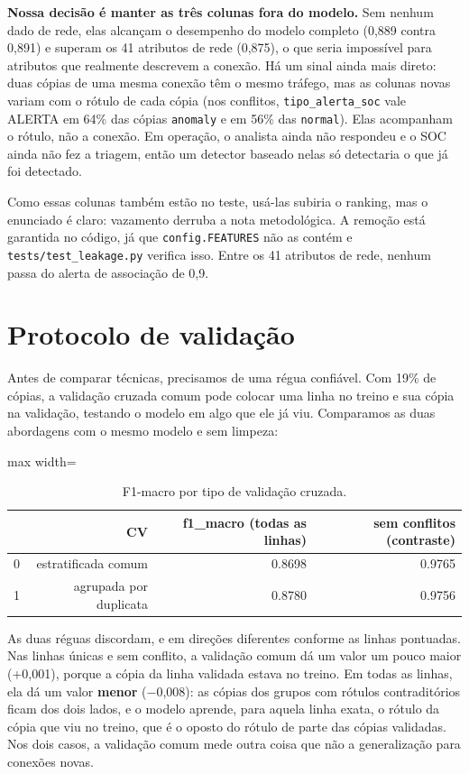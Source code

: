 \documentclass[11pt,a4paper]{article}
\begin{document}
\textbf{Nossa decisão é manter as três colunas fora do modelo.} Sem nenhum dado de rede, elas alcançam o desempenho do modelo completo (0,889 contra 0,891) e superam os 41 atributos de rede (0,875), o que seria impossível para atributos que realmente descrevem a conexão. Há um sinal ainda mais direto: duas cópias de uma mesma conexão têm o mesmo tráfego, mas as colunas novas variam com o rótulo de cada cópia (nos conflitos, \texttt{tipo\_alerta\_soc} vale ALERTA em 64\% das cópias \texttt{anomaly} e em 56\% das \texttt{normal}). Elas acompanham o rótulo, não a conexão. Em operação, o analista ainda não respondeu e o SOC ainda não fez a triagem, então um detector baseado nelas só detectaria o que já foi detectado.

Como essas colunas também estão no teste, usá-las subiria o ranking, mas o enunciado é claro: vazamento derruba a nota metodológica. A remoção está garantida no código, já que \texttt{config.FEATURES} não as contém e \texttt{tests/test\_leakage.py} verifica isso. Entre os 41 atributos de rede, nenhum passa do alerta de associação de 0,9.

\section{Protocolo de validação}

Antes de comparar técnicas, precisamos de uma régua confiável. Com 19\% de cópias, a validação cruzada comum pode colocar uma linha no treino e sua cópia na validação, testando o modelo em algo que ele já viu. Comparamos as duas abordagens com o mesmo modelo e sem limpeza:

\begin{table}[H]
\centering
\caption{F1-macro por tipo de validação cruzada.}
\begin{adjustbox}{max width=\linewidth}
\begin{tabular}{lrrr}
\toprule
 & CV & f1\_macro (todas as linhas) & sem conflitos (contraste) \\
\midrule
0 & estratificada comum & 0.8698 & 0.9765 \\
1 & agrupada por duplicata & 0.8780 & 0.9756 \\
\bottomrule
\end{tabular}
\end{adjustbox}
\end{table}

As duas réguas discordam, e em direções diferentes conforme as linhas pontuadas. Nas linhas únicas e sem conflito, a validação comum dá um valor um pouco maior (+0,001), porque a cópia da linha validada estava no treino. Em todas as linhas, ela dá um valor \textbf{menor} ($-$0,008): as cópias dos grupos com rótulos contraditórios ficam dos dois lados, e o modelo aprende, para aquela linha exata, o rótulo da cópia que viu no treino, que é o oposto do rótulo de parte das cópias validadas. Nos dois casos, a validação comum mede outra coisa que não a generalização para conexões novas.
\end{document}
